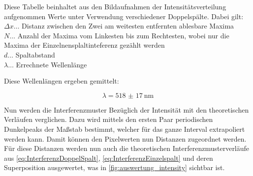 \documentclass[12pt,english,ngerman]{scrartcl}
\begin{document}
\begin{table}[H]
	\centering
	\caption{Diese Tabelle beinhaltet aus den Bildaufnahmen der Intensitätsverteilung 
  aufgenommen Werte unter Verwendung verschiedener Doppelspälte. Dabei gilt: \\
$\Delta x \dots$ Distanz zwischen den Zwei am weitesten entfernten ablesbare Maxima \\
$N \dots$ Anzahl der Maxima vom Linkesten bis zum Rechtesten, wobei nur 
die Maxima der Einzelnensplaltinteferenz gezählt werden\\
$d \dots$ Spaltabstand \\
$\lambda \dots$ Errechnete Wellenlänge 
}\label{tab:auswertungWellenlangenDoppelspalt}
	
\end{table}

Diese Wellenlängen ergeben gemittelt:

\begin{equation*}
	\lambda = \SI{518(17)}{\nm}
\end{equation*}

Nun werden die Interferenzmuster Bezüglich der Intensität mit den theoretischen Verläufen
verglichen. Dazu wird mittels den ersten Paar periodischen Dunkelpeaks der
Maßstab bestimmt, welcher für das ganze Interval extrapoliert werden kann.
Damit können den Pixelwerten nun Distanzen zugeordnet werden. Für diese
Distanzen werden nun auch die theoretischen Interferenzmusterverläufe aus
\autoref{eq:InterferenzDoppelSpalt}, \autoref{eq:InterferenzEinzelspalt} und
deren Superposition ausgewertet, was in
\autoref{fig:auswertung_intensity} sichtbar ist.
\end{document}
